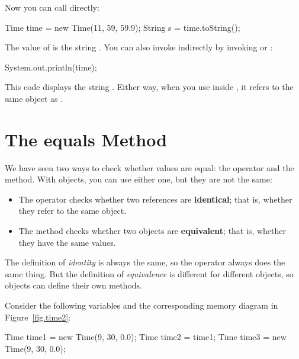 
Now you can call  directly:

\begin{code}
Time time = new Time(11, 59, 59.9);
String s = time.toString();
\end{code}

The value of  is the string .
You can also invoke  indirectly by invoking  or :

\begin{code}
System.out.println(time);
\end{code}

This code displays the string .
Either way, when you use  inside , it refers to the same object as .


\section{The equals Method}
\label{equals}


We have seen two ways to check whether values are equal: the \java{==} operator and the  method.
With objects, you can use either one, but they are not the same:


\begin{itemize}

\item The \java{==} operator checks whether two references are {\bf identical}; that is, whether they refer to the same object.

\item The  method checks whether two objects are {\bf equivalent}; that is, whether they have the same values.

\end{itemize}

The definition of {\em identity} is always the same, so the \java{==} operator always does the same thing.
But the definition of {\em equivalence} is different for different objects, so objects can define their own  methods.

Consider the following variables and the corresponding memory diagram in Figure~\ref{fig.time2}:

\begin{code}
Time time1 = new Time(9, 30, 0.0);
Time time2 = time1;
Time time3 = new Time(9, 30, 0.0);
\end{code}

